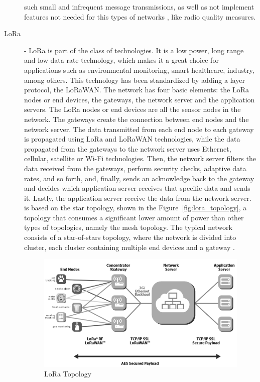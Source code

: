 \begin{description}
            such small and infrequent message transmissions, as well as not implement features
            not needed for this types of networks \cite{Mekki2018}, like radio quality measures.
      \item[LoRa] - \Gls{LoRa} is part of the  class of technologies. It is a low
            power, long range and low data rate technology, which
            makes it a great choice for applications such as environmental monitoring, smart
            healthcare, industry, among others. This technology has been standardized by
            adding a  layer protocol, the \Gls{LoRaWAN}. The 
            network has four basic elements: the LoRa nodes or end devices, the gateways, the
            network server and the application servers. The LoRa nodes or end devices are all
            the sensor nodes in the network. The gateways create the connection between end
            nodes and the network server. The data transmitted from each end node to each
            gateway is propagated using LoRa and LoRaWAN technologies, while the data propagated
            from the gateways to the network server uses Ethernet, cellular, satellite or
            Wi-Fi technologies. Then, the network server filters the data received from the
            gateways, perform security checks, adaptive data rates, and so forth, and, finally,
            sends an acknowledge back to the gateway and decides which application server
            receives that specific data and sends it. Lastly, the application server receive
            the data from the network server\cite{Carvalho2017, Devalal2018}.
             is based on the star topology, shown in the Figure~\ref{fig:lora_topology},
            a topology that consumes a significant lower amount of power than other types of
            topologies, namely the mesh topology. The typical network consists of a star-of-stars
            topology, where the network is divided into cluster, each cluster containing multiple
            end devices and a gateway \cite{Aslam2019}.
            \begin{figure}[H]
                  \caption{LoRa Topology \cite{Devalal2018}}
                  \centering
                  \includegraphics[scale=0.7]{Chapters/Figures/lora topology.png}

\end{figure}
\end{description}

